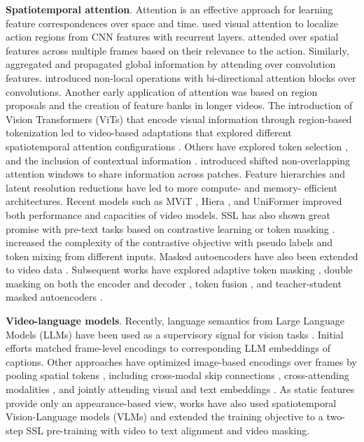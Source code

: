 \noindent
\textbf{Spatiotemporal attention}. Attention is an effective approach for learning feature correspondences over space and time. \citet{sharma2015action} used visual attention to localize action regions from CNN features with recurrent layers. \citet{du2017recurrent} attended over spatial features across multiple frames based on their relevance to the action. Similarly, \citet{chen20182} aggregated and propagated global information by attending over convolution features. \citet{wang2018non} introduced non-local operations with bi-directional attention blocks over convolutions. Another early application of attention \citep{girdhar2019video} was based on region proposals and the creation of feature banks \citep{wu2019long} in longer videos. The introduction of Vision Transformers (ViTs) \citep{dosovitskiy2020image} that encode visual information through region-based tokenization led to video-based adaptations that explored different spatiotemporal attention configurations \citep{arnab2021vivit,bertasius2021space}. Others have explored token selection \citep{bulat2021space,ryoo2021tokenlearner,zha2021shifted}, and the inclusion of contextual information \citep{kim2021relational}. \citet{liu2022video} introduced shifted non-overlapping attention windows to share information across patches. Feature hierarchies and latent resolution reductions have led to more compute- \citep{fan2021multiscale,li2022mvitv2} and memory- \citep{wu2022memvit} efficient architectures. Recent models such as MViT \citep{yan2022multiview}, Hiera \citep{ryali2023hiera}, and UniFormer \citep{li2022uniformer} improved both performance and capacities of video models. SSL has also shown great promise with pre-text tasks based on contrastive learning \citep{chen2020simple} or token masking \citep{he2022masked}. \citet{xing2023svformer} increased the complexity of the contrastive objective with pseudo labels and token mixing from different inputs. Masked autoencoders have also been extended to video data \citep{feichtenhofer2022masked,wei2022masked}. Subsequent works have explored adaptive token masking \citep{bandara2023adamae}, double masking on both the encoder and decoder \citep{wang2023videomae}, token fusion \citep{kim2024token}, and teacher-student masked autoencoders \citep{wang2023masked}.

\noindent
\textbf{Video-language models}. Recently, language semantics from Large Language Models (LLMs) \citep{brown2020language,touvron2023llama} have been used as a supervisory signal for vision tasks \citep{li2023blip,liu2024visual,radford2021learning}. Initial efforts \citep{zellers2021merlot} matched frame-level encodings to corresponding LLM embeddings of captions. Other approaches have optimized image-based encodings over frames by pooling spatial tokens \citep{yu2022coca}, including cross-modal skip connections \citep{xu2023mplug}, cross-attending modalities \citep{alayrac2022flamingo}, and jointly attending visual and text embeddings \citep{maaz2023video}. As static features provide only an appearance-based view, works have also used spatiotemporal Vision-Language models (VLMs) \citep{piergiovanni2024mirasol3b} and extended the training objective \citep{lu2024enhancing,zhao2024videoprism} to a two-step SSL pre-training with video to text alignment and video masking.